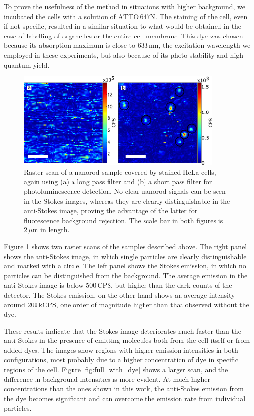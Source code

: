\documentclass[journal=nalefd,manuscript=letter]{achemso}
\newcommand{\nm}{\ensuremath{\,\textrm{nm}}}
\newcommand{\um}{\ensuremath{\,\mu\textrm{m}}}
\newcommand{\CPS}{\ensuremath{\,\textrm{CPS}}}
\newcommand{\kCPS}{\ensuremath{\,\textrm{kCPS}}}
\newcommand{\atto}{\ensuremath{\textrm{ATTO}\,647\textrm{N}}}
\begin{document}
To prove the usefulness of the method in situations with higher background, we
incubated the cells with a solution of \atto. The staining of the cell, even if
not specific, resulted in a similar situation to what would be obtained in the
case of labelling of organelles or the entire cell membrane. This dye was chosen
because its absorption maximum is close to $633\nm$, the excitation wavelength
we employed in these experiments, but also because of its photo stability and
high quantum yield.

\begin{figure}[htp] \centering
\includegraphics[width=0.9\textwidth]{Figures/05_Stokes_AS_with_dye/stokes_as_with_dye.png}
\caption{Raster scan of a nanorod sample covered by stained HeLa cells, again
using (a) a long pass filter and (b) a short pass filter for photoluminescence
detection. No clear nanorod signals can be seen in the Stokes images, whereas
they are clearly distinguishable in the anti-Stokes image, proving the advantage
of the latter for fluorescence background rejection. The scale bar in both
figures is $2\um$ in length.}
	\label{fig:Stokes_AS_with_dye}
\end{figure}

Figure \ref{fig:Stokes_AS_with_dye} shows two raster scans of the samples
described above. The right panel shows the anti-Stokes image, in which single
particles are clearly distinguishable and marked with a circle. The left panel
shows the Stokes emission, in which no particles can be distinguished from the
background. The average emission in the anti-Stokes image is below $500\CPS$,
but higher than the dark counts of the detector. The Stokes emission, on the other
hand shows an average intensity around $200\kCPS$, one order of magnitude higher
than that observed without the dye.

These results indicate that the Stokes image deteriorates much faster than the
anti-Stokes in the presence of emitting molecules both from the cell itself or
from added dyes. The images show regions with higher emission intensities in
both configurations, most probably due to a higher concentration of dye in
specific regions of the cell. Figure \ref{fig:full_with_dye} shows a larger
scan, and the difference in background intensities is more evident. At much
higher concentrations than the ones shown in this work, the anti-Stokes emission
from the dye becomes significant and can overcome the emission rate from
individual particles.
\end{document}
